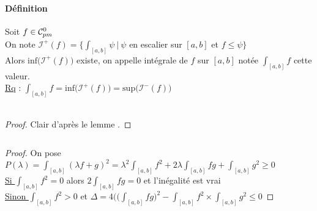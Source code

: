 		\paragraph{Définition}
			Soit $f\in{\mathcal{C}_{pm}^0}$ \\On note $\mathcal{I}^+(f)=\Big\{ \int_{[a,b]} \psi ~|~\psi$ en escalier sur $[a,b]$ et $f\leq \psi \Big\} $ \\
			Alors $\mathrm{inf}\big(\mathcal{I}^+(f)\big)$ existe, on appelle intégrale de $f$ sur $[a,b]$ notée $\int_{[a,b]} f$ cette valeur.
			\trait\vspace*{-1.1cm} \\ 
		\underline{Rq} : $\int_{[a,b]} f = \mathrm{inf}\big(\mathcal{I}^+(f)\big) = \mathrm{sup}\big(\mathcal{I}^-(f)\big)$
		\vspace*{0.5cm} \\ 
		\vspace*{0.5cm} \\ 
		\begin{proof}
		Clair d'après le lemme %
        .
		\end{proof}
		${}$ \\ 
		\begin{proof}
		On pose $P(\lambda)=\int_{[a,b]} (\lambda f+g)^2 = \lambda^2 \int_{[a,b]} f^2 + 2\lambda \int_{[a,b]} fg + \int_{[a,b]} g^2 \geq 0$\\
		\underline{Si $\int_{[a,b]} f^2 =0$} alors $2\int_{[a,b]} fg=0$ et l'inégalité est vrai \\
		\underline{Sinon $\int_{[a,b]} f^2 >0$} et $\Delta = 4\Big( \big( \int_{[a,b]} fg \big)^2 - \int_{[a,b]} f^2 \times\int_{[a,b]} g^2 \leq 0$ 
		\end{proof} \traitd
